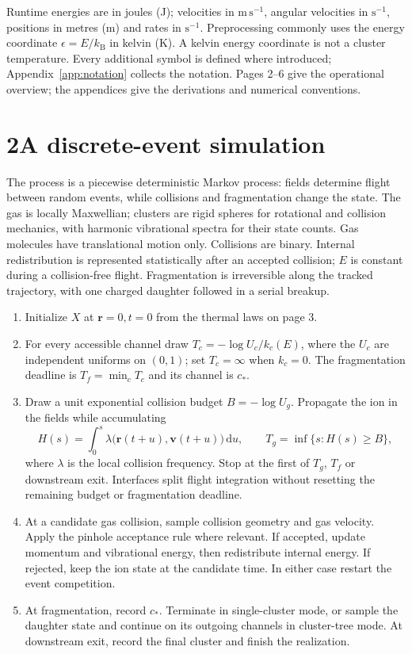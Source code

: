 \documentclass[10pt,a4paper]{article}
\newcommand{\dd}{\,\mathrm d}
\newcommand{\kb}{k_{\mathrm B}}
\newcommand{\overview}[2]{\section*{#1\quad #2}\addcontentsline{toc}{section}{#1 #2}}
\newenvironment{steps}{\begin{enumerate}\setlength{\itemsep}{3pt}\setlength{\parskip}{0pt}}{\end{enumerate}}
\begin{document}
Runtime energies are in joules (J); velocities in $\mathrm{m\,s^{-1}}$, angular
velocities in $\mathrm{s^{-1}}$, positions in metres (m) and rates in
$\mathrm{s^{-1}}$. Preprocessing commonly uses the energy coordinate
$\epsilon=E/\kb$ in kelvin (K). A kelvin energy coordinate is not a cluster
temperature. Every additional symbol is defined where introduced; Appendix~\ref{app:notation}
collects the notation. Pages 2--6 give the operational overview; the appendices
give the derivations and numerical conventions.

\clearpage
\overview{2}{A discrete-event simulation}
The process is a piecewise deterministic Markov process: fields determine flight
between random events, while collisions and fragmentation change the state.
The gas is locally Maxwellian; clusters are rigid spheres for rotational and
collision mechanics, with harmonic vibrational spectra for their state counts.
Gas molecules have translational motion only. Collisions are binary. Internal
redistribution is represented statistically after an accepted collision; $E$ is
constant during a collision-free flight. Fragmentation is irreversible along
the tracked trajectory, with one charged daughter followed in a serial breakup.

\begin{steps}
\item Initialize $X$ at $\mathbf r=0,t=0$ from the thermal laws on page 3.
\item For every accessible channel draw $T_c=-\log U_c/k_c(E)$, where the
$U_c$ are independent uniforms on $(0,1)$; set $T_c=\infty$ when $k_c=0$.
The fragmentation deadline is $T_f=\min_c T_c$ and its channel is $c_*$.
\item Draw a unit exponential collision budget $B=-\log U_g$.
Propagate the ion in the fields while accumulating
\[
 H(s)=\int_0^s\lambda\bigl(\mathbf r(t+u),\mathbf v(t+u)\bigr)\dd u,
 \qquad T_g=\inf\{s:H(s)\geq B\},
\]
where $\lambda$ is the local collision frequency. Stop at the first of $T_g$,
$T_f$ or downstream exit. Interfaces split flight integration without resetting
the remaining budget or fragmentation deadline.
\item At a candidate gas collision, sample collision geometry and gas velocity.
Apply the pinhole acceptance rule where relevant. If accepted, update momentum
and vibrational energy, then redistribute internal energy. If rejected, keep the
ion state at the candidate time. In either case restart the event competition.
\item At fragmentation, record $c_*$. Terminate in single-cluster mode, or
sample the daughter state and continue on its outgoing channels in cluster-tree
mode. At downstream exit, record the final cluster and finish the realization.
\end{steps}
\end{document}
